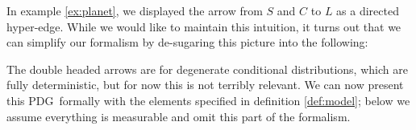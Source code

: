 \documentclass{article}
\newcommand{\MN}{PDG}
\begin{document}
	\begin{example}
		In example \ref{ex:planet}, we displayed the arrow from $S$ and $C$ to $L$ as a directed hyper-edge. While we would like to maintain this intuition, it turns out that we can simplify our formalism by de-sugaring this picture into the following:
		\begin{center}
		\end{center}
		The double headed arrows are for degenerate conditional distributions, which are fully deterministic, but for now this is not terribly relevant. We can now present this \MN\ formally with the elements specified in definition \ref{def:model}; below we assume everything is measurable and omit this part of the formalism.
		

\end{example}
\end{document}
